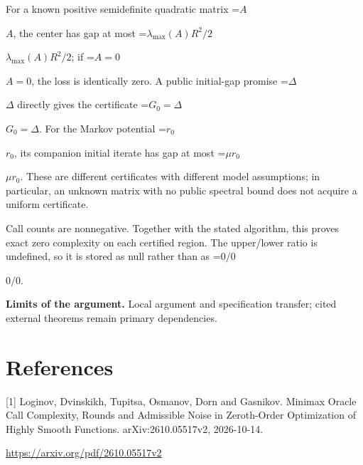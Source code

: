 \documentclass[10pt,a4paper]{article}
\newcommand{\AtlasMath}[1]{\par\begingroup\centering\setbox0=\hbox{$\displaystyle #1$}\ifdim\wd0>1.4\linewidth\typeout{ATLAS WIDE FORMULA: \the\wd0}\fi\ifdim\wd0>\linewidth\resizebox{\linewidth}{!}{\box0}\else\box0\fi\par\endgroup}
\newcommand{\AtlasInlineMath}[1]{\begingroup\setbox0=\hbox{$#1$}\ifdim\wd0>.4\linewidth\endgroup\AtlasMath{#1}\else\endgroup$#1$\fi}
\begin{document}
For a known positive semidefinite quadratic matrix \AtlasInlineMath{A}, the center has gap at most \AtlasInlineMath{\lambda_{\max}(A)R^2/2}; if \AtlasInlineMath{A=0}, the loss is identically zero. A public initial-gap promise \AtlasInlineMath{\Delta} directly gives the certificate \AtlasInlineMath{G_0=\Delta}. For the Markov potential \AtlasInlineMath{r_0}, its companion initial iterate has gap at most \AtlasInlineMath{\mu r_0}. These are different certificates with different model assumptions; in particular, an unknown matrix with no public spectral bound does not acquire a uniform certificate.

Call counts are nonnegative. Together with the stated algorithm, this proves exact zero complexity on each certified region. The upper/lower ratio is undefined, so it is stored as null rather than as \AtlasInlineMath{0/0}.

\textbf{Limits of the argument.} Local argument and specification transfer; cited external theorems remain primary dependencies.

\section{References}
[1] Loginov, Dvinskikh, Tupitsa, Osmanov, Dorn and Gasnikov. Minimax Oracle Call Complexity, Rounds and Admissible Noise in Zeroth-Order Optimization of Highly Smooth Functions. arXiv:2610.05517v2, 2026-10-14.

\url{https://arxiv.org/pdf/2610.05517v2}
\end{document}
